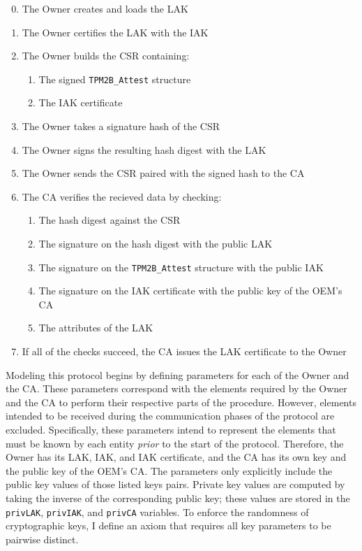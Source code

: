 \documentclass[runningheads]{llncs}
\begin{document}
\begin{enumerate}[itemsep=0pt,parsep=0pt,partopsep=0pt]
  \setcounter{enumi}{-1}
  \item The Owner creates and loads the LAK
  \item The Owner certifies the LAK with the IAK
  \item The Owner builds the CSR containing:
  \begin{enumerate}[topsep=0pt, itemsep=0pt,parsep=0pt,partopsep=0pt]
    \item The signed \verb|TPM2B_Attest| structure
    \item The IAK certificate
  \end{enumerate}
  \item The Owner takes a signature hash of the CSR
  \item The Owner signs the resulting hash digest with the LAK
  \item The Owner sends the CSR paired with the signed hash to the CA
  \item The CA verifies the recieved data by checking:
  \begin{enumerate}[topsep=0pt, itemsep=0pt,parsep=0pt,partopsep=0pt]
    \item The hash digest against the CSR
    \item The signature on the hash digest with the public LAK
    \item The signature on the \verb|TPM2B_Attest| structure with the public IAK
    \item The signature on the IAK certificate with the public key of the OEM's CA
    \item The attributes of the LAK
  \end{enumerate}
  \item If all of the checks succeed, the CA issues the LAK certificate to the Owner
\end{enumerate}

Modeling this protocol begins by defining parameters for each of the Owner and the CA. These parameters correspond with the elements required by the Owner and the CA to perform their respective parts of the procedure. However, elements intended to be received during the communication phases of the protocol are excluded. Specifically, these parameters intend to represent the elements that must be known by each entity \textit{prior} to the start of the protocol. Therefore, the Owner has its LAK, IAK, and IAK certificate, and the CA has its own key and the public key of the OEM's CA. The parameters only explicitly include the public key values of those listed keys pairs. Private key values are computed by taking the inverse of the corresponding public key; these values are stored in the \verb|privLAK|, \verb|privIAK|, and \verb|privCA| variables. To enforce the randomness of cryptographic keys, I define an axiom that requires all key parameters to be pairwise distinct. 
\end{document}
